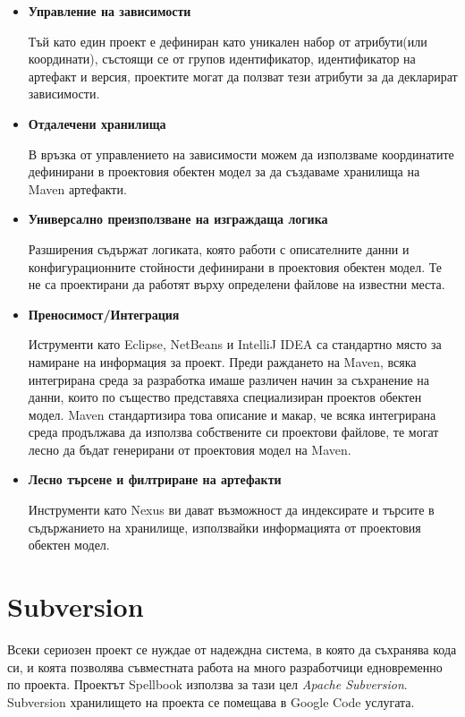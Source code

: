 \begin{itemize}
  \item \textbf{Управление на зависимости}

    Тъй като един проект е дефиниран като уникален набор от
    атрибути(или координати), състоящи се от групов идентификатор,
    идентификатор на артефакт и версия, проектите могат да ползват
    тези атрибути за да декларират зависимости.

  \item \textbf{Отдалечени хранилища}
    
    В връзка от управлението на зависимости можем да използваме
    координатите дефинирани в проектовия обектен модел за да създаваме
    хранилища на Maven артефакти.
  
  \item \textbf{Универсално преизползване на изграждаща логика}
    
    Разширения съдържат логиката, която работи с описателните данни и
    конфигурационните стойности дефинирани в проектовия обектен
    модел. Те не са проектирани да работят върху определени файлове на
    известни места.

  \item \textbf{Преносимост/Интеграция}
    
    Иструменти като Eclipse, NetBeans и IntelliJ IDEA са стандартно
    място за намиране на информация за проект. Преди раждането на
    Maven, всяка интегрирана среда за разработка имаше различен начин
    за съхранение на данни, които по същество представяха
    специализиран проектов обектен модел. Maven стандартизира това
    описание и макар, че всяка интегрирана среда продължава да
    използва собствените си проектови файлове, те могат лесно да бъдат
    генерирани от проектовия модел на Maven.

  \item \textbf{Лесно търсене и филтриране на артефакти}
    
    Инструменти като Nexus ви дават възможност да индексирате и
    търсите в съдържанието на хранилище, използвайки информацията от
    проектовия обектен модел.
\end{itemize}
\section{Subversion}

Всеки сериозен проект се нуждае от надеждна система, в която да
съхранява кода си, и коята позволява съвместната работа на много
разработчици едновременно по проекта. Проектът Spellbook използва за
тази цел \emph{Apache Subversion}. Subversion хранилището на проекта се
помещава в Google Code услугата.

